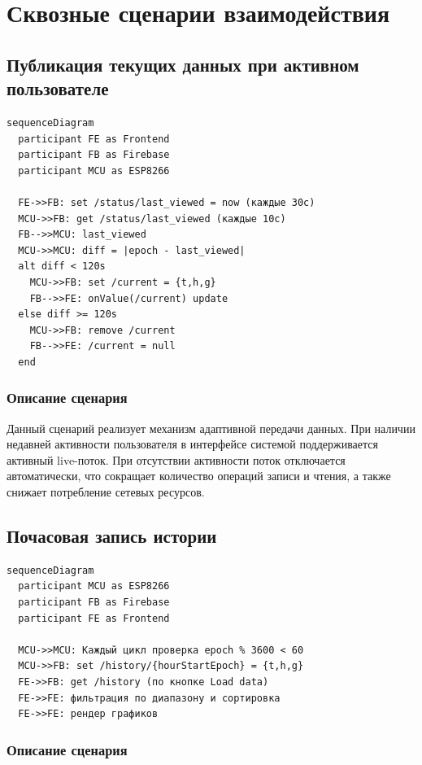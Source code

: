 \section{Сквозные сценарии взаимодействия}

\subsection{Публикация текущих данных при активном пользователе}

\begin{verbatim}
sequenceDiagram
  participant FE as Frontend
  participant FB as Firebase
  participant MCU as ESP8266

  FE->>FB: set /status/last_viewed = now (каждые 30с)
  MCU->>FB: get /status/last_viewed (каждые 10с)
  FB-->>MCU: last_viewed
  MCU->>MCU: diff = |epoch - last_viewed|
  alt diff < 120s
    MCU->>FB: set /current = {t,h,g}
    FB-->>FE: onValue(/current) update
  else diff >= 120s
    MCU->>FB: remove /current
    FB-->>FE: /current = null
  end
\end{verbatim}

\subsubsection*{Описание сценария}

Данный сценарий реализует механизм адаптивной передачи данных. При наличии недавней активности пользователя в интерфейсе системой поддерживается активный live-поток. При отсутствии активности поток отключается автоматически, что сокращает количество операций записи и чтения, а также снижает потребление сетевых ресурсов.

\subsection{Почасовая запись истории}

\begin{verbatim}
sequenceDiagram
  participant MCU as ESP8266
  participant FB as Firebase
  participant FE as Frontend

  MCU->>MCU: Каждый цикл проверка epoch % 3600 < 60
  MCU->>FB: set /history/{hourStartEpoch} = {t,h,g}
  FE->>FB: get /history (по кнопке Load data)
  FE->>FE: фильтрация по диапазону и сортировка
  FE->>FE: рендер графиков
\end{verbatim}

\subsubsection*{Описание сценария}

